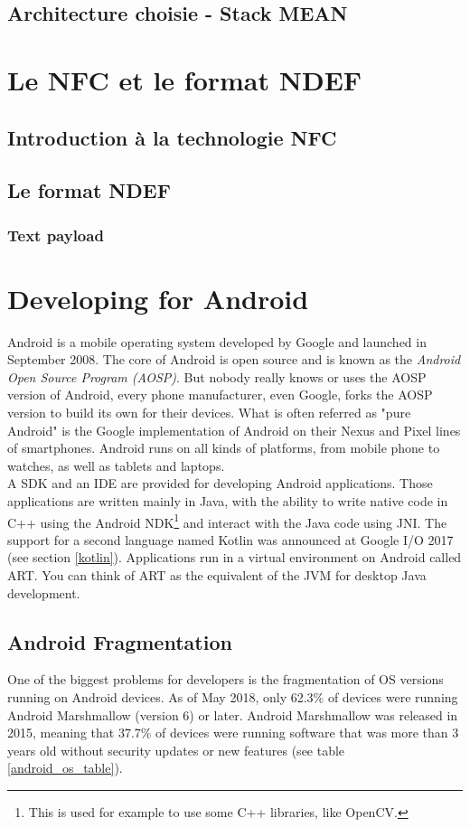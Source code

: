 \documentclass[11pt,a4paper]{report}
\begin{document}
\section{Architecture choisie - Stack MEAN}
\chapter{Le NFC et le format NDEF}
\section{Introduction à la technologie NFC}
\section{Le format NDEF}
\subsection{Text payload}




\chapter{Developing for Android}
\label{android_chapter}
Android is a mobile operating system developed by Google and launched in September 2008. The core of Android is open source and is known as the \emph{Android Open Source Program (AOSP)}. But nobody really knows or uses the AOSP version of Android, every phone manufacturer, even Google, forks the AOSP version to build its own for their devices. What is often referred as "pure Android" is the Google implementation of Android on their Nexus and Pixel lines of smartphones. Android runs on all kinds of platforms, from mobile phone to watches, as well as tablets and laptops. \\

A SDK and an IDE are provided for developing Android applications. Those applications are written mainly in Java, with the ability to write native code in C++ using the Android NDK\footnote{This is used for example to use some C++ libraries, like OpenCV.} and interact with the Java code using JNI. The support for a second language named Kotlin was announced at Google I/O 2017 (see section \ref{kotlin}). Applications run in a virtual environment on Android called ART. You can think of ART as the equivalent of the JVM for desktop Java development.
\section{Android Fragmentation}
One of the biggest problems for developers is the fragmentation of OS versions running on Android devices. As of May 2018, only 62.3\% of devices were running Android Marshmallow (version 6) or later. Android Marshmallow was released in 2015, meaning that 37.7\% of devices were running software that was more than 3 years old without security updates or new features (see table \ref{android_os_table}).
\end{document}
